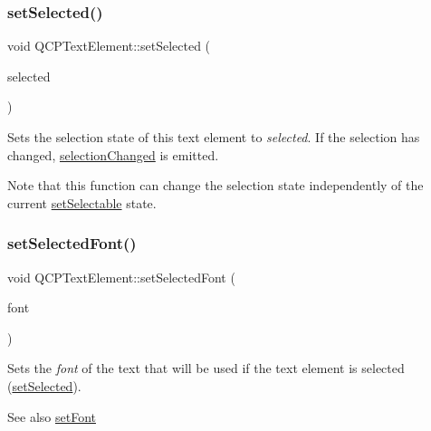\subsubsection{\texorpdfstring{set\+Selected()}{setSelected()}}
{\footnotesize\ttfamily void Q\+C\+P\+Text\+Element\+::set\+Selected (\begin{DoxyParamCaption}\item[{bool}]{selected }\end{DoxyParamCaption})}

Sets the selection state of this text element to {\itshape selected}. If the selection has changed, \hyperlink{class_q_c_p_text_element_a49f45b87ee9c1fe866c2cdd12af17a9a}{selection\+Changed} is emitted.

Note that this function can change the selection state independently of the current \hyperlink{class_q_c_p_text_element_a3c5f9b1897a036b16495ed3fb8371c55}{set\+Selectable} state. \mbox{\label{class_q_c_p_text_element_a0a2397a3c4ede519e16ab3e991904065}} 
\subsubsection{\texorpdfstring{set\+Selected\+Font()}{setSelectedFont()}}
{\footnotesize\ttfamily void Q\+C\+P\+Text\+Element\+::set\+Selected\+Font (\begin{DoxyParamCaption}\item[{const Q\+Font \&}]{font }\end{DoxyParamCaption})}

Sets the {\itshape font} of the text that will be used if the text element is selected (\hyperlink{class_q_c_p_text_element_aba5521f9fb22a5f3d2f09ab37d4a1751}{set\+Selected}).

\begin{DoxySeeAlso}{See also}
\hyperlink{class_q_c_p_text_element_a09b3241769528fa87cb4bf35c97defad}{set\+Font} 
\end{DoxySeeAlso}
\mbox{\label{class_q_c_p_text_element_abaec200cae70a0eade53583defc0476d}} 
